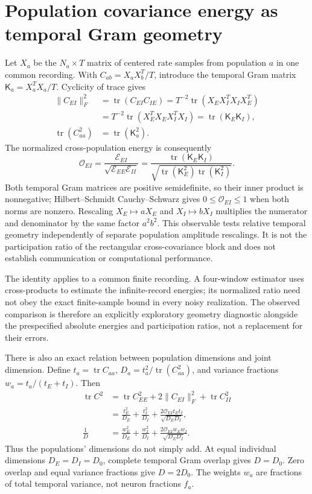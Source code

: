 \section{Population covariance energy as temporal Gram geometry}
Let $X_a$ be the $N_a\times T$ matrix of centered rate samples from population
$a$ in one common recording. With $C_{ab}=X_aX_b^T/T$, introduce the temporal
Gram matrix $\mathsf K_a=X_a^TX_a/T$. Cyclicity of trace gives
\begin{align}
 \|C_{EI}\|_F^2
 &=\operatorname{tr}(C_{EI}C_{IE})
 =T^{-2}\operatorname{tr}(X_EX_I^TX_IX_E^T)\\
 &=T^{-2}\operatorname{tr}(X_E^TX_EX_I^TX_I)
 =\operatorname{tr}(\mathsf K_E\mathsf K_I),\\
 \operatorname{tr}(C_{aa}^2)&=\operatorname{tr}(\mathsf K_a^2).
\end{align}
The normalized cross-population energy is consequently
\begin{equation}
 \mathcal O_{EI}=
 \frac{\mathcal E_{EI}}{\sqrt{\mathcal E_{EE}\mathcal E_{II}}}
 =\frac{\operatorname{tr}(\mathsf K_E\mathsf K_I)}
 {\sqrt{\operatorname{tr}(\mathsf K_E^2)\operatorname{tr}(\mathsf K_I^2)}}.
\end{equation}
Both temporal Gram matrices are positive semidefinite, so their inner product
is nonnegative; Hilbert--Schmidt Cauchy--Schwarz gives $0\leq\mathcal O_{EI}\leq1$
when both norms are nonzero. Rescaling $X_E\mapsto aX_E$ and $X_I\mapsto bX_I$
multiplies the numerator and denominator by the same factor $a^2b^2$.
This observable tests relative temporal geometry independently of separate
population amplitude rescalings. It is not the participation ratio of the
rectangular cross-covariance block and does not establish communication or
computational performance.

The identity applies to a common finite recording. A four-window estimator
uses cross-products to estimate the infinite-record energies; its normalized
ratio need not obey the exact finite-sample bound in every noisy realization.
The observed comparison is therefore an explicitly exploratory geometry
diagnostic alongside the prespecified absolute energies and participation
ratios, not a replacement for their errors.

There is also an exact relation between population dimensions and joint
dimension. Define $t_a=\operatorname{tr}C_{aa}$,
$D_a=t_a^2/\operatorname{tr}(C_{aa}^2)$, and variance fractions
$w_a=t_a/(t_E+t_I)$. Then
\begin{align}
 \operatorname{tr}C^2
 &=\operatorname{tr}C_{EE}^2+2\|C_{EI}\|_F^2
    +\operatorname{tr}C_{II}^2\\
 &=\frac{t_E^2}{D_E}+\frac{t_I^2}{D_I}
    +\frac{2\mathcal O_{EI}t_Et_I}{\sqrt{D_ED_I}},\\
 \frac1D
 &=\frac{w_E^2}{D_E}+\frac{w_I^2}{D_I}
    +\frac{2\mathcal O_{EI}w_Ew_I}{\sqrt{D_ED_I}}.
\end{align}
Thus the populations' dimensions do not simply add. At equal individual
dimensions $D_E=D_I=D_0$, complete temporal Gram overlap gives $D=D_0$.
Zero overlap and equal variance fractions give $D=2D_0$. The weights $w_a$
are fractions of total temporal variance, not neuron fractions $f_a$.
